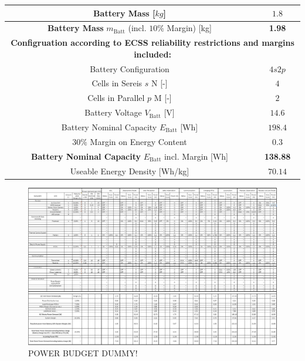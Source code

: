 \begin{table}[htb]
\begin{tabular}{|c|c|}
Battery Mass  [$kg$]                                                               & $1.8$                         \\ \hline
\textbf{Battery Mass} $m_\text{Batt}$ (incl. $10\%$ Margin) [kg]                                         & \textbf{1.98}                        \\ \hline
\multicolumn{2}{|c|}{\textbf{Configruation according to ECSS reliability restrictions and margins included:}} \\ \hline
Battery Configuration                                                           & $4s2p$                        \\ \hline
Cells in Sereis $s$ N [-]                                                       & $4$                           \\ \hline
Cells in Parallel $p$ M [-]                                                     & $2$                           \\ \hline
Battery Voltage $V_\text{Batt}$ [V]                                             & $14.6 $                       \\ \hline
Battery Nominal Capacity $E_\text{Batt}$ [Wh]                                   & $198.4$                       \\ \hline
$30\%$ Margin on Energy Content                                                 & $0.3$                         \\ \hline
\textbf{Battery Nominal Capacity} $E_\text{Batt}$ incl. Margin [Wh]                      & \textbf{138.88}                      \\ \hline
Useable Energy Density [Wh/kg]                                              & $70.14$                       \\ \hline
\end{tabular}

\label{tab:battery}
\end{table}

\begin{figure}[htb]
{\centering
\includegraphics[width=1.0\textwidth]{Media/powerbudgetdummy}
\caption{POWER BUDGET DUMMY!}
\label{tab:powerbudgetcomplete}
}
\end{figure}

